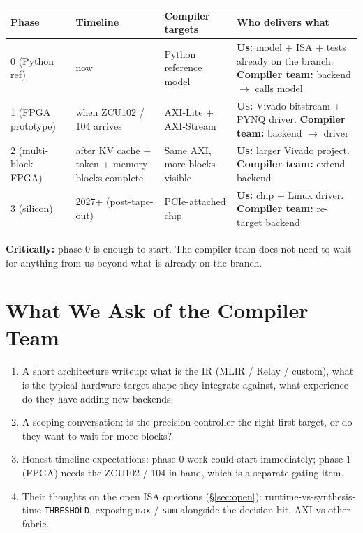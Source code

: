 \documentclass[11pt]{article}
\begin{document}
\begin{table}[h]
\centering
\small
\renewcommand{\arraystretch}{1.15}
\begin{tabular}{@{}l l p{3.4cm} p{6cm}@{}}
\toprule
Phase                        & Timeline                                      & Compiler targets             & Who delivers what \\
\midrule
0 (Python ref)               & now                                           & Python reference model        & \textbf{Us:} model + ISA + tests already on the branch. \textbf{Compiler team:} backend $\rightarrow$ calls model \\[0.4em]
1 (FPGA prototype)           & when ZCU102 / 104 arrives                     & AXI-Lite + AXI-Stream         & \textbf{Us:} Vivado bitstream + PYNQ driver. \textbf{Compiler team:} backend $\rightarrow$ driver \\[0.4em]
2 (multi-block FPGA)         & after KV cache + token + memory blocks complete & Same AXI, more blocks visible & \textbf{Us:} larger Vivado project. \textbf{Compiler team:} extend backend \\[0.4em]
3 (silicon)                  & 2027+ (post-tape-out)                         & PCIe-attached chip            & \textbf{Us:} chip + Linux driver. \textbf{Compiler team:} re-target backend \\
\bottomrule
\end{tabular}
\end{table}

\noindent
\textbf{Critically:} phase 0 is enough to start. The compiler team does not
need to wait for anything from us beyond what is already on the branch.

\clearpage
\section{What We Ask of the Compiler Team}
\label{sec:asks}

\begin{enumerate}
\item A short architecture writeup: what is the IR (MLIR / Relay / custom),
  what is the typical hardware-target shape they integrate against, what
  experience do they have adding new backends.
\item A scoping conversation: is the precision controller the right first
  target, or do they want to wait for more blocks?
\item Honest timeline expectations: phase 0 work could start immediately;
  phase 1 (FPGA) needs the ZCU102 / 104 in hand, which is a separate gating
  item.
\item Their thoughts on the open ISA questions (\S\ref{sec:open}):
  runtime-vs-synthesis-time \texttt{THRESHOLD}, exposing
  \texttt{max} / \texttt{sum} alongside the decision bit, AXI vs other
  fabric.
\end{enumerate}
\end{document}
